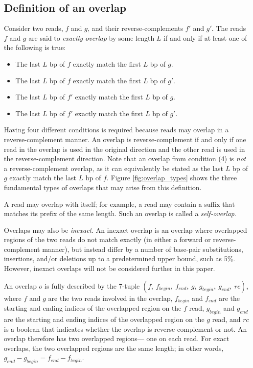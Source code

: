 \documentclass[12pt]{article}
\newcommand{\LengthVar}{L}
\newcommand{\Figure}[1]{Figure \ref{#1}}
\newcommand{\KeyTerm}[1]{{\it #1}}
\begin{document}
\subsection{Definition of an overlap}
	Consider two reads, $f$ and $g$, and their reverse-complements $f'$ and
	$g'$.  The reads $f$ and $g$ are said to \KeyTerm{exactly overlap} by some
	length $\LengthVar$ if and only if at least one of the following is true:
	\begin{itemize}
		\item The last $\LengthVar$ bp of $f$ exactly match the first
		$\LengthVar$ bp of $g$.
		\item The last $\LengthVar$ bp of $f$ exactly match the first
		$\LengthVar$ bp of $g'$.
		\item The last $\LengthVar$ bp of $f'$ exactly match the first
		$\LengthVar$ bp of $g$.
		\item The last $\LengthVar$ bp of $f'$ exactly match the first
		$\LengthVar$ bp of $g'$.
	\end{itemize}

Having four different conditions is required because reads may overlap in a
reverse-complement manner.  An overlap is reverse-complement if and only if one
read in the overlap is used in the original direction and the other read is used
in the reverse-complement direction.  Note that an overlap from condition (4) is
{\em not} a reverse-complement overlap, as it can equivalently be stated as the
last $\LengthVar$ bp of $g$ exactly match the last $\LengthVar$ bp of $f$.
\Figure{fig:overlap_types} shows the three fundamental types of overlaps that
may arise from this definition.

A read may overlap with itself; for example, a read may contain a suffix that
matches its prefix of the same length.  Such an overlap is called a
\KeyTerm{self-overlap}.

Overlaps may also be \KeyTerm{inexact}.  An inexact overlap is an overlap where
overlapped regions of the two reads do not match exactly (in either a forward or
reverse-complement manner), but instead differ by a number of base-pair
substitutions, insertions, and/or deletions up to a predetermined upper bound,
such as 5\%.  However, inexact overlaps will not be considered further in this
paper.

An overlap $o$ is fully described by the 7-tuple $(f,\ f_{begin},\ f_{end},\ g,
\ g_{begin},\ g_{end},\ rc)$, where $f$ and $g$ are the two reads involved in the
overlap, $f_{begin}$ and $f_{end}$ are the starting and ending indices of the
overlapped region on the $f$ read, $g_{begin}$ and $g_{end}$ are the starting
and ending indices of the overlapped region on the $g$ read, and $rc$ is a
boolean that indicates whether the overlap is reverse-complement or not.  An
overlap therefore has two overlapped regions--- one on each read.  For exact
overlaps, the two overlapped regions are the same length; in other words,
$g_{end} - g_{begin} = f_{end} - f_{begin}$.
\end{document}
